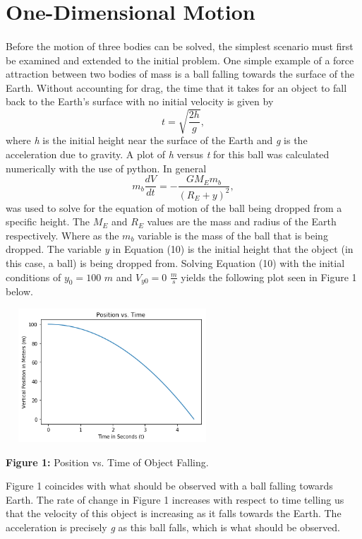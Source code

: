 \documentclass[]{article}
\begin{document}
\section{One-Dimensional Motion}
\begin{multicols}{2}
\paragraph{}
\setlength{\parskip}{1em}
Before the motion of three bodies can be solved, the simplest scenario must first be examined and extended to the initial problem. One simple example of a force attraction between two bodies of mass is a ball falling towards the surface of the Earth. Without accounting for drag, the time that it takes for an object to fall back to the Earth's surface with no initial velocity is given by 
\begin{equation}\label{9}
t=\sqrt{\frac{2h}{g}},
\end{equation}
where \textit{h} is the initial height near the surface of the Earth and \textit{g} is the acceleration due to gravity. A plot of \textit{h} versus \textit{t} for this ball was calculated numerically with the use of python. In general
\begin{equation}\label{10}
m_{b}\frac{dV}{dt}=-\frac{GM_{E}m_{b}}{(R_{E}+y)^2},
\end{equation}
was used to solve for the equation of motion of the ball being dropped from a specific height. The $M_{E}$ and $R_{E}$ values are the mass and radius of the Earth respectively. Where as the $m_b$ variable is the mass of the ball that is being dropped. The variable \textit{y} in Equation (10) is the initial height that the object (in this case, a ball) is being dropped from. Solving Equation (10) with the initial conditions of $y_0=100$ $m$ and $V_{y0}=0$ $\frac{m}{s}$ yields the following plot seen in Figure 1 below. 
\begin{center}
\includegraphics[width=8cm, height=5.0cm]{PHYS 342 FP 1D Position Plot.png}
\caption{\small{\textbf{Figure 1:}} \tiny{Position vs. Time of Object Falling.}}
\end{center}
Figure 1 coincides with what should be observed with a ball falling towards Earth. The rate of change in Figure 1 increases with respect to time telling us that the velocity of this object is increasing as it falls towards the Earth. The acceleration is precisely \textit{g} as this ball falls, which is what should be observed.
\par
\end{multicols}
\newpage
\end{document}
